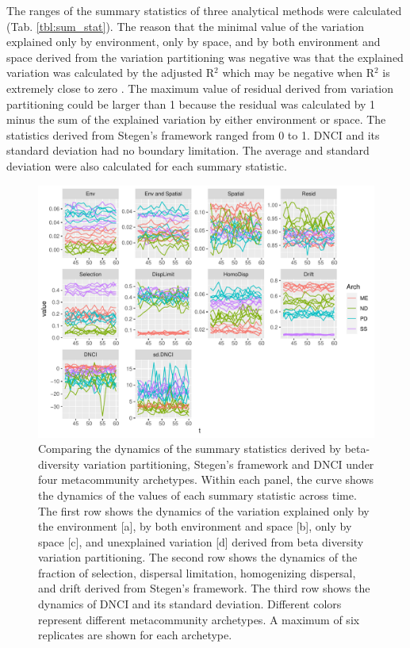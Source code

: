	The ranges of the summary statistics of three analytical methods were calculated (Tab. \ref{tbl:sum_stat}). The reason that the minimal value of the variation explained only by environment, only by space, and by both environment and space derived from the variation partitioning was negative was that the explained variation was calculated by the adjusted R$^2$ which may be negative when R$^2$ is extremely close to zero \citep[pp.~633]{legendre2012numerical}. The maximum value of residual derived from variation partitioning could be larger than 1 because the residual was calculated by 1 minus the sum of the explained variation by either environment or space. The statistics derived from Stegen's framework ranged from 0 to 1. DNCI and its standard deviation had no boundary limitation. The average and standard deviation were also calculated for each summary statistic.
	
	\begin{figure}
		\centering
		\includegraphics[width=\textwidth]{./figures/Compare_archetypes_six_rep.pdf}
		\caption[Comparing the dynamics of the summary statistics derived by beta-diversity variation partitioning, Stegen's framework and DNCI under four metacommunity archetypes.]{\small
			Comparing the dynamics of the summary statistics derived by beta-diversity variation partitioning, Stegen's framework and DNCI under four metacommunity archetypes. Within each panel, the curve shows the dynamics of the values of each summary statistic across time. The first row shows the dynamics of the variation explained only by the environment [a], by both environment and space [b], only by space [c], and unexplained variation [d] derived from beta diversity variation partitioning. The second row shows the dynamics of the fraction of selection, dispersal limitation, homogenizing dispersal, and drift derived from Stegen's framework. The third row shows the dynamics of DNCI and its standard deviation. Different colors represent different metacommunity archetypes. A maximum of six replicates are shown for each archetype.}
		\label{fig:stat_comp}
	\end{figure}
	
